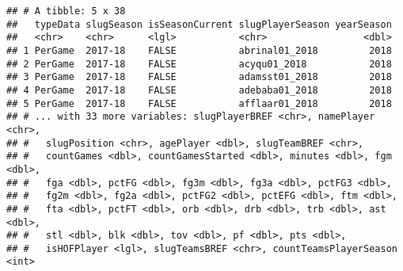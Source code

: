 \documentclass[]{article}
\newenvironment{Shaded}{\begin{snugshade}}{\end{snugshade}}
\newcommand{\KeywordTok}[1]{\textcolor[rgb]{0.13,0.29,0.53}{\textbf{#1}}}
\newcommand{\DataTypeTok}[1]{\textcolor[rgb]{0.13,0.29,0.53}{#1}}
\newcommand{\DecValTok}[1]{\textcolor[rgb]{0.00,0.00,0.81}{#1}}
\newcommand{\StringTok}[1]{\textcolor[rgb]{0.31,0.60,0.02}{#1}}
\newcommand{\ControlFlowTok}[1]{\textcolor[rgb]{0.13,0.29,0.53}{\textbf{#1}}}
\newcommand{\OperatorTok}[1]{\textcolor[rgb]{0.81,0.36,0.00}{\textbf{#1}}}
\newcommand{\NormalTok}[1]{#1}
\begin{document}
\begin{Shaded}
\end{Shaded}

\begin{verbatim}
## # A tibble: 5 x 38
##   typeData slugSeason isSeasonCurrent slugPlayerSeason yearSeason
##   <chr>    <chr>      <lgl>           <chr>                 <dbl>
## 1 PerGame  2017-18    FALSE           abrinal01_2018         2018
## 2 PerGame  2017-18    FALSE           acyqu01_2018           2018
## 3 PerGame  2017-18    FALSE           adamsst01_2018         2018
## 4 PerGame  2017-18    FALSE           adebaba01_2018         2018
## 5 PerGame  2017-18    FALSE           afflaar01_2018         2018
## # ... with 33 more variables: slugPlayerBREF <chr>, namePlayer <chr>,
## #   slugPosition <chr>, agePlayer <dbl>, slugTeamBREF <chr>,
## #   countGames <dbl>, countGamesStarted <dbl>, minutes <dbl>, fgm <dbl>,
## #   fga <dbl>, pctFG <dbl>, fg3m <dbl>, fg3a <dbl>, pctFG3 <dbl>,
## #   fg2m <dbl>, fg2a <dbl>, pctFG2 <dbl>, pctEFG <dbl>, ftm <dbl>,
## #   fta <dbl>, pctFT <dbl>, orb <dbl>, drb <dbl>, trb <dbl>, ast <dbl>,
## #   stl <dbl>, blk <dbl>, tov <dbl>, pf <dbl>, pts <dbl>,
## #   isHOFPlayer <lgl>, slugTeamsBREF <chr>, countTeamsPlayerSeason <int>
\end{verbatim}

\begin{Shaded}
\end{Shaded}
\end{document}
